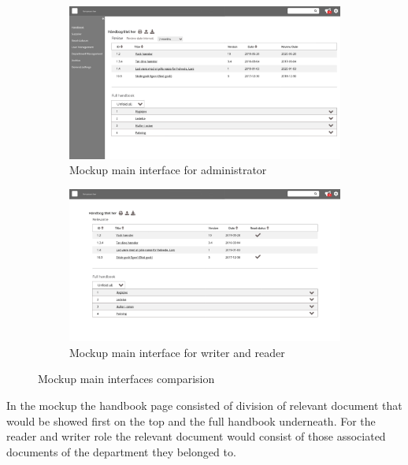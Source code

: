 \begin{figure}[H]
	\centering
	\begin{subfigure}[b]{0.48\textwidth}
		\includegraphics[width=\textwidth]{billeder/ForsideAdmin.jpg}
		\caption{Mockup main interface for administrator}
	\end{subfigure}
	\quad
	\begin{subfigure}[b]{0.48\textwidth}
		\includegraphics[width=\textwidth]{billeder/ForsideWriterReader.jpg}
		\caption{Mockup main interface for writer and reader}
	\end{subfigure}
	\caption{Mockup main interfaces comparision}\label{fig:mockupSidebar}
\end{figure}

In the mockup the handbook page consisted of division of relevant document that would be showed first on the top and the full handbook underneath.
For the reader and writer role the relevant document would consist of those associated documents of the department they belonged to.

